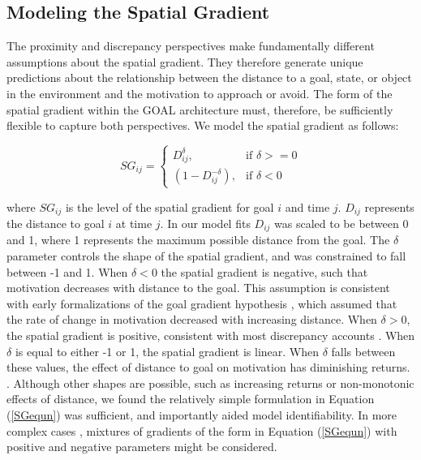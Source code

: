 \documentclass[a4paper,doc,natbib,donotrepeattitle]{apa6}
\begin{document}
\subsection{Modeling the Spatial Gradient}

The proximity and discrepancy perspectives make fundamentally different assumptions about the spatial gradient. They therefore generate unique predictions about the relationship between the distance to a goal, state, or object in the environment and the motivation to approach or avoid. The form of the spatial gradient within the GOAL architecture must, therefore, be sufficiently flexible to capture both perspectives. We model the spatial gradient as follows:

\begin{equation}
SG_{ij} =
\begin{cases}
D_{ij}^\delta, & \text{if } \delta >= 0 \\
(1-D_{ij}^{-\delta}), & \text{if } \delta < 0
\end{cases}
\label{SGequn}
\end{equation}

\noindent where $SG_{ij}$ is the level of the spatial gradient for goal $i$ and time $j$. $D_{ij}$ represents the distance to goal $i$ at time $j$. In our model fits $D_{ij}$ was scaled to be between 0 and 1, where 1 represents the maximum possible distance from the goal. The $\delta$ parameter controls the shape of the spatial gradient, and was constrained to fall between -1 and 1. When $\delta < 0$ the spatial gradient is negative, such that motivation decreases with distance to the goal. This assumption is consistent with early formalizations of the goal gradient hypothesis \citep[e.g.,][]{Hull1938}, which assumed that the rate of change in motivation decreased with increasing distance. When $\delta > 0$, the spatial gradient is positive, consistent with most discrepancy accounts \citep[e.g.,][]{Vancouver2005}. When $\delta$ is equal to either -1 or 1, the spatial gradient is linear. When $\delta$ falls between these values, the effect of distance to goal on motivation has diminishing returns. \citep[e.g.,][]{Kahneman1979}. Although other shapes are possible, such as increasing returns or non-monotonic effects of distance, we found the relatively simple formulation in Equation (\ref{SGequn}) was sufficient, and importantly aided model identifiability. In more complex cases \cite[e.g.,][]{Bonezzi2011}, mixtures of gradients of the form in Equation (\ref{SGequn}) with positive and negative parameters might be considered.
\end{document}
